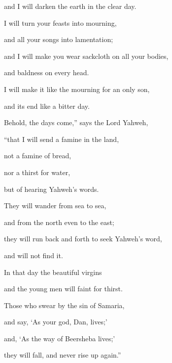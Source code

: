 {\par }{\QB and I will darken the earth in the clear day.
\par }{\Q {}I will turn your feasts into mourning,
\par }{\QB and all your songs into lamentation;
\par }{\Q and I will make you wear sackcloth on all your bodies,
\par }{\QB and baldness on every head.
\par }{\Q I will make it like the mourning for an only son,
\par }{\QB and its end like a bitter day.
\par }{\Q {}Behold, the days come,” says the Lord Yahweh,
\par }{\QB “that I will send a famine in the land,
\par }{\QB not a famine of bread,
\par }{\QB nor a thirst for water,
\par }{\QB but of hearing Yahweh’s words.
\par }{\Q {}They will wander from sea to sea,
\par }{\QB and from the north even to the east;
\par }{\QB they will run back and forth to seek Yahweh’s word,
\par }{\QB and will not find it.
\par }{\Q {}In that day the beautiful virgins
\par }{\QB and the young men will faint for thirst.
\par }{\Q {}Those who swear by the sin of Samaria,
\par }{\QB and say, ‘As your god, Dan, lives;’
\par }{\QB and, ‘As the way of Beersheba lives;’
\par }{\QB they will fall, and never rise up again.”

}
